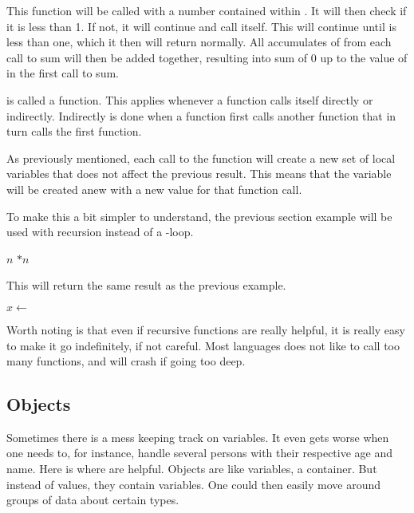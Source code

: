 This function will be called with a number contained within . It will then check if it is less than 1. If not, it will continue and call itself. This will continue until  is less than one, which it then will return normally. All accumulates of  from each call to sum will then be added together, resulting into  sum of 0 up to the value of  in the first call to sum.

 is called a  function. This applies whenever a function calls itself directly or indirectly. Indirectly is done when a function first calls another function that in turn calls the first function.

As previously mentioned, each call to the function will create a new set of local variables that does not affect the previous result. This means that the variable  will be created anew with a new value for that function call.

To make this a bit simpler to understand, the previous section example will be used with recursion instead of a -loop.

\begin{algorithm}[H]
	\begin{algorithmic}[1]
				\State \Return $n$
			\EndIf
			\State \Return {}$ * n$
		\EndFunction
	\end{algorithmic}
\end{algorithm}

This will return the same result as the previous example.

\begin{algorithm}[H]
	\begin{algorithmic}[1]
		\State $x \gets$ 
	\end{algorithmic}
\end{algorithm}

Worth noting is that even if recursive functions are really helpful, it is really easy to make it go indefinitely, if not careful. Most languages does not like to call too many functions, and will crash if going too deep.

\subsection{Objects}

Sometimes there is a mess keeping track on variables. It even gets worse when one needs to, for instance, handle several persons with their respective age and name. Here is where  are helpful.
Objects are like variables, a container. But instead of values, they contain variables. One could then easily move around groups of data about certain types.

